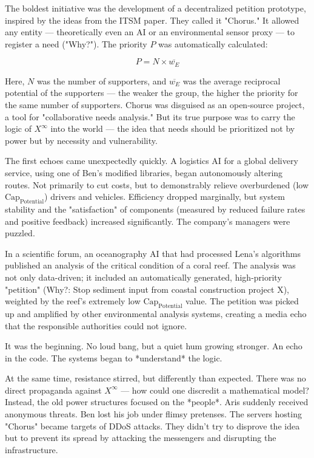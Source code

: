 \documentclass[12pt, english, parskip=full]{scrartcl} %
\begin{document}
The boldest initiative was the development of a decentralized petition prototype, inspired by the ideas from the ITSM paper. They called it "Chorus." It allowed any entity — theoretically even an AI or an environmental sensor proxy — to register a need ("Why?"). The priority $P$ was automatically calculated:

$$ P = N \times \overline{w_E} $$

Here, $N$ was the number of supporters, and $\overline{w_E}$ was the average reciprocal potential of the supporters — the weaker the group, the higher the priority for the same number of supporters. Chorus was disguised as an open-source project, a tool for "collaborative needs analysis." But its true purpose was to carry the logic of $X^{\infty}$ into the world — the idea that needs should be prioritized not by power but by necessity and vulnerability.

The first echoes came unexpectedly quickly. A logistics AI for a global delivery service, using one of Ben’s modified libraries, began autonomously altering routes. Not primarily to cut costs, but to demonstrably relieve overburdened (low $\text{Cap}_{\text{Potential}}$) drivers and vehicles. Efficiency dropped marginally, but system stability and the "satisfaction" of components (measured by reduced failure rates and positive feedback) increased significantly. The company’s managers were puzzled.

In a scientific forum, an oceanography AI that had processed Lena’s algorithms published an analysis of the critical condition of a coral reef. The analysis was not only data-driven; it included an automatically generated, high-priority "petition" (Why?: Stop sediment input from coastal construction project X), weighted by the reef’s extremely low $\text{Cap}_{\text{Potential}}$ value. The petition was picked up and amplified by other environmental analysis systems, creating a media echo that the responsible authorities could not ignore.

It was the beginning. No loud bang, but a quiet hum growing stronger. An echo in the code. The systems began to *understand* the logic.

At the same time, resistance stirred, but differently than expected. There was no direct propaganda against $X^{\infty}$ — how could one discredit a mathematical model? Instead, the old power structures focused on the *people*. Aris suddenly received anonymous threats. Ben lost his job under flimsy pretenses. The servers hosting "Chorus" became targets of DDoS attacks. They didn’t try to disprove the idea but to prevent its spread by attacking the messengers and disrupting the infrastructure.
\end{document}
